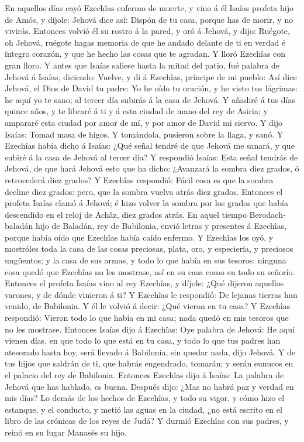  En aquellos días cayó Ezechîas enfermo de muerte, y vino
á él Isaías profeta hijo de Amós, y díjole: Jehová dice así: Dispón de
tu casa, porque has de morir, y no vivirás.  Entonces
volvió él su rostro á la pared, y oró á Jehová, y dijo: 
Ruégote, oh Jehová, ruégote hagas memoria de que he andado delante de ti
en verdad é íntegro corazón, y que he hecho las cosas que te agradan. Y
lloró Ezechîas con gran lloro.  Y antes que Isaías saliese
hasta la mitad del patio, fué palabra de Jehová á Isaías, diciendo:
 Vuelve, y di á Ezechîas, príncipe de mi pueblo: Así dice
Jehová, el Dios de David tu padre: Yo he oído tu oración, y he visto tus
lágrimas: he aquí yo te sano; al tercer día subirás á la casa de Jehová.
 Y añadiré á tus días quince años, y te libraré á ti y á
esta ciudad de mano del rey de Asiria; y ampararé esta ciudad por amor
de mí, y por amor de David mi siervo.  Y dijo Isaías:
Tomad masa de higos. Y tomándola, pusieron sobre la llaga, y sanó.
 Y Ezechîas había dicho á Isaías: ¿Qué señal tendré de que
Jehová me sanará, y que subiré á la casa de Jehová al tercer día?
 Y respondió Isaías: Esta señal tendrás de Jehová, de que
hará Jehová esto que ha dicho: ¿Avanzará la sombra diez grados, ó
retrocederá diez grados?  Y Ezechîas respondió: Fácil
cosa es que la sombra decline diez grados: pero, que la sombra vuelva
atrás diez grados.  Entonces el profeta Isaías clamó á
Jehová; é hizo volver la sombra por los grados que había descendido en
el reloj de Achâz, diez grados atrás.  En aquel tiempo
Berodach-baladán hijo de Baladán, rey de Babilonia, envió letras y
presentes á Ezechîas, porque había oído que Ezechîas había caído
enfermo.  Y Ezechîas los oyó, y mostróles toda la casa de
las cosas preciosas, plata, oro, y especiería, y preciosos ungüentos; y
la casa de sus armas, y todo lo que había en sus tesoros: ninguna cosa
quedó que Ezechîas no les mostrase, así en su casa como en todo su
señorío.  Entonces el profeta Isaías vino al rey
Ezechîas, y díjole: ¿Qué dijeron aquellos varones, y de dónde vinieron á
ti? Y Ezechîas le respondió: De lejanas tierras han venido, de
Babilonia.  Y él le volvió á decir: ¿Qué vieron en tu
casa? Y Ezechîas respondió: Vieron todo lo que había en mi casa; nada
quedó en mis tesoros que no les mostrase.  Entonces
Isaías dijo á Ezechîas: Oye palabra de Jehová:  He aquí
vienen días, en que todo lo que está en tu casa, y todo lo que tus
padres han atesorado hasta hoy, será llevado á Babilonia, sin quedar
nada, dijo Jehová.  Y de tus hijos que saldrán de ti, que
habrás engendrado, tomarán; y serán eunucos en el palacio del rey de
Babilonia.  Entonces Ezechîas dijo á Isaías: La palabra
de Jehová que has hablado, es buena. Después dijo: ¿Mas no habrá paz y
verdad en mis días?  Lo demás de los hechos de Ezechîas,
y todo su vigor, y cómo hizo el estanque, y el conducto, y metió las
aguas en la ciudad, ¿no está escrito en el libro de las crónicas de los
reyes de Judá?  Y durmió Ezechîas con sus padres, y reinó
en su lugar Manasés su hijo.

